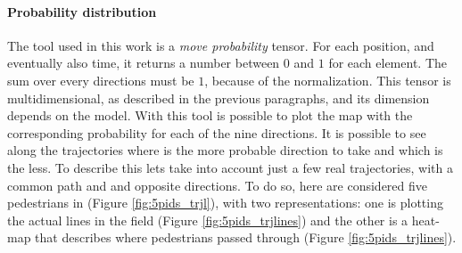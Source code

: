 \documentclass[class=article, crop=false]{standalone}
\begin{document}


\FloatBarrier
\paragraph{Probability distribution}
The tool used in this work is a \emph{move probability} tensor.
For each position, and eventually also time, it returns a number between $0$ and $1$ for each element.
The sum over every directions must be $1$, because of the normalization.
This tensor is multidimensional, as described in the previous paragraphs, and its dimension depends on the model.
With this tool is possible to plot the map with the corresponding probability for each of the nine directions.
It is possible to see along the trajectories where is the more probable direction to take and which is the less.
To describe this lets take into account just a few real trajectories, with a common path and and opposite directions.
To do so, here are considered five pedestrians in (Figure \ref{fig:5pids_trjl}), with two representations:
one is plotting the actual lines in the field (Figure \ref{fig:5pids_trjlines}) and the other is a heat-map that describes where pedestrians passed through (Figure \ref{fig:5pids_trjlines}).
\end{document}
